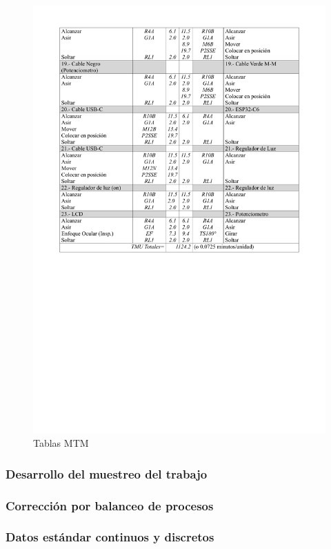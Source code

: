 \begin{figure}[H]
        \includegraphics[scale=0.15]{30/img/tablaMTM1-3.pdf}
        \caption{Tablas MTM}
         \label{fig:tablasMTM}
    \end{figure}
    \subsubsection{Desarrollo del muestreo del trabajo}
    \subsubsection{Corrección por balanceo de procesos}
    \subsubsection{Datos estándar continuos y discretos}
